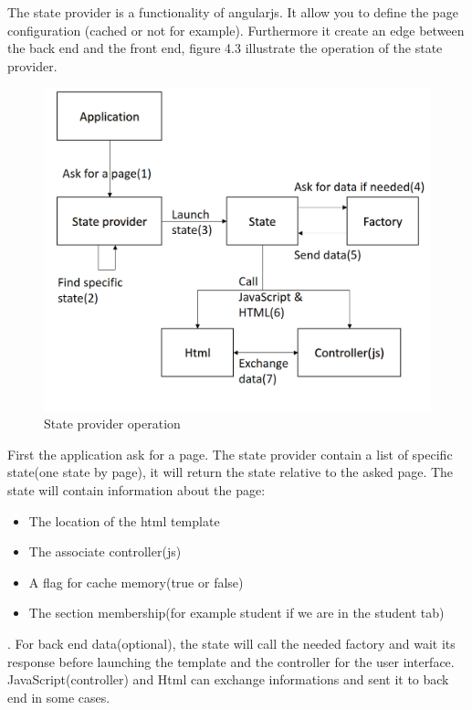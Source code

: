 \documentclass[11pt, a4paper]{report}
\begin{document}
The state provider is a functionality of angularjs. It allow you to define the page configuration (cached or not for example). Furthermore it create an edge between the back end and the front end, figure 4.3 illustrate the operation of the state provider. 
\begin{figure}[H]
\centering
\includegraphics[scale = 0.3]{Images/stateProvider_arch.png}
\caption{State provider operation}
\end{figure}
First the application ask for a page. The state provider contain a list of specific state(one state by page), it will return the state relative to the asked page. The state will contain information about the page:
\begin{itemize}
\item The location of the html template
\item The associate controller(js)
\item A flag for cache memory(true or false)
\item The section membership(for example student if we are in the student tab)
\end{itemize}. For back end data(optional), the state will call the needed factory and wait its response before launching the template and the controller for the user interface. JavaScript(controller) and Html can exchange informations and sent it to back end in some cases.

\end{document}
